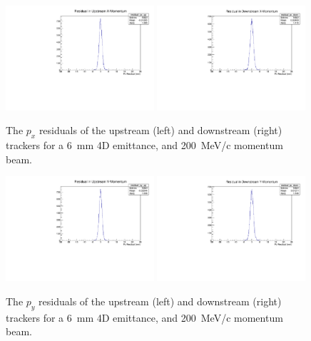   \begin{figure}[p]
    \begin{center}
      \includegraphics[width=0.49\textwidth, angle=0]{08-Performance/residual_px_up.pdf}
      \includegraphics[width=0.49\textwidth, angle=0]{08-Performance/residual_px_down.pdf}
      \caption{\label{fig:PxResidKalman} The $p_x$ residuals of the upstream (left) and downstream (right) trackers for a 6~mm 4D emittance, and 200~MeV/c momentum beam.}
    \end{center}
  \end{figure}
  
  \begin{figure}[p]
    \begin{center}
      \includegraphics[width=0.49\textwidth, angle=0]{08-Performance/residual_py_up.pdf}
      \includegraphics[width=0.49\textwidth, angle=0]{08-Performance/residual_py_down.pdf}
      \caption{\label{fig:PyResidKalman} The $p_y$ residuals of the upstream (left) and downstream (right) trackers for a 6~mm 4D emittance, and 200~MeV/c momentum beam.}
    \end{center}
  \end{figure}
  
